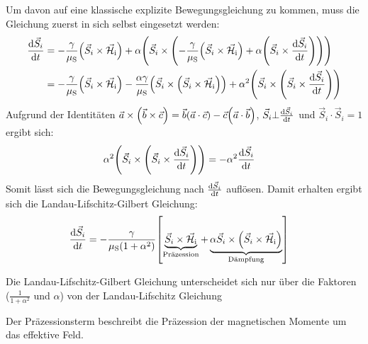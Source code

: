 \documentclass[main.tex]{subfiles}
\begin{document}
Um davon auf eine klassische explizite Bewegungsgleichung zu kommen, muss die
Gleichung zuerst in sich selbst eingesetzt werden:
\begin{align}
	\dv{\vec{S}_i}{t} & = -\frac{\gamma }{\mu_{\text{S}}}\qty(\vec{S}_i
	\times
	\vec{\mathcal{H}}_{\text{i}}) + \alpha \qty(\vec{S}_i \times
	\qty(-\frac{\gamma }{\mu_{\text{S}}}\qty(\vec{S}_i
		\times
		\vec{\mathcal{H}}_{\text{i}}) + \alpha \qty(\vec{S}_i \times
	\dv{\vec{S}_i}{t})))                                                \\
	                  & = -\frac{\gamma }{\mu_{\text{S}}}\qty(\vec{S}_i
	\times
	\vec{\mathcal{H}}_{\text{i}}) - \frac{\alpha\gamma}{\mu_\text{S}}
	\qty(\vec{S}_i \times \qty(\vec{S}_i \times
		\vec{\mathcal{H}}_{\text{i}})) +
	\alpha^2 \qty(\vec{S}_i \times \qty(\vec{S}_i \times
		\dv{\vec{S}_i}{t}))
\end{align}
Aufgrund der Identitäten \(\vec{a} \times \qty(\vec{b} \times \vec{c}) =
\vec{b} \qty(\vec{a} \cdot \vec{c}) - \vec{c} \qty(\vec{a} \cdot \vec{b})\),
\(\vec{S}_i \bot \dv{\vec{S}_i}{t}\) und \(\vec{S}_i \cdot \vec{S}_i = 1\)
ergibt sich:
\begin{align}
	\alpha^2 \qty(\vec{S}_i \times \qty(\vec{S}_i \times
	\dv{\vec{S}_i}{t})) & = -\alpha^2\dv{\vec{S}_i}{t}
\end{align}
Somit lässt sich die Bewegungsgleichung nach \(\dv{\vec{S}_i}{t}\) auflösen.
Damit erhalten ergibt sich die Landau-Lifschitz-Gilbert Gleichung:
\begin{align}
	\dv{\vec{S}_i}{t} & = -\frac{\gamma
	}{\mu_{\text{S}}(1+\alpha^2)}\qty[\underbrace{\vec{S}_i \times
			\vec{\mathcal{H}}_{\text{i}}}_\text{Präzession} +
		\underbrace{\alpha \vec{S}_i
			\times
			\qty(\vec{S}_i \times
			\vec{\mathcal{H}}_{\text{i}})}_\text{Dämpfung}]\label{eq:llg}
\end{align}

Die Landau-Lifschitz-Gilbert Gleichung unterscheidet sich nur über die Faktoren
(\(\frac{1
}{1 + \alpha^2}\) und \(\alpha\)) von der Landau-Lifschitz Gleichung

Der Präzessionsterm beschreibt die Präzession der magnetischen Momente um das effektive Feld.
\end{document}
